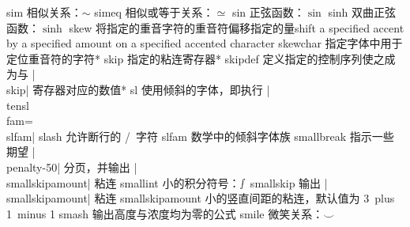 \capcs sim {相似关系：$\sim$}{}{}
\capcs simeq {相似或等于关系：$\simeq$}{}{}
\capcs sin {正弦函数：$\sin$}{}{}
\capcs sinh {双曲正弦函数：$\sinh$}{}{}
\capcs skew {将指定的重音字符的重音符偏移指定的量shift a specified accent by a specified amount on a specified accented character}{}{}
\capcs skewchar {指定字体中用于定位重音符的字符}*{}
\capcs skip {指定的粘连寄存器}*{}
\capcs skipdef {定义指定的控制序列使之成为与 |\\skip| 寄存器对应的数值}*{}
\capcs sl {使用倾斜的字体，即执行 |\\tensl\\fam=\\slfam|}{}{}
\capcs slash {允许断行的 \slash\ 字符}{}{}
\capcs slfam {数学中的倾斜字体族}{}{}
\capcs smallbreak {指示一些期望 |\\penalty-50| 分页，并输出 |\\smallskipamount| 粘连}{}{}
\capcs smallint {小的积分符号：$\smallint$}{}{}
\capcs smallskip {输出 |\\smallskipamount| 粘连}{}{}
\capcs smallskipamount {小的竖直间距的粘连，默认值为 3\pt\ plus 1\pt\ minus 1\pt}{}{}
\capcs smash {输出高度与浓度均为零的公式}{}{}
\capcs smile {微笑关系：$\smile$}{}{}
